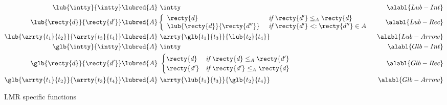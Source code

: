 \begin{figure*}[t]
  \begin{boxedminipage}{\linewidth}
  \begin{align*}
    \lub{\intty}{\intty} \lubred{A}
    &\ \intty & \alabl{Lub-Int} \\
    \lub{\recty{d}}{\recty{d'}} \lubred{A}&
    \left\{
    \begin{array}{ll}
    \recty{d} 
    & \textit{\ if\ } \recty{d'} \leq_A \recty{d}  \\
    \lub{\recty{d}}{\recty{d''}} 
    &\textit{\ if\ } \recty{d'} <: \recty{d''} \in A
    \end{array}\right.
    & \alabl{Lub-Rec} \\
    \lub{\arrty{t_1}{t_2}}{\arrty{t_3}{t_4}}
    \lubred{A} &\ \arrty{\glb{t_1}{t_3}}{\lub{t_2}{t_4}} & \alabl{Lub-Arrow} \\
    \glb{\intty}{\intty}
    \lubred{A}&\ \intty & \alabl{Glb-Int} \\
    \glb{\recty{d}}{\recty{d'}}
    \lubred{A}&\
                     \begin{cases}
                       \recty{d} & \textit{if } \recty{d} \leq_A \recty{d'} \\
                       \recty{d'} &  \textit{if } \recty{d'} \leq_A \recty{d} \\
                     \end{cases} & \alabl{Glb-Rec} \\
    \glb{\arrty{t_1}{t_2}}{\arrty{t_3}{t_4}}
    \lubred{A}&\ \arrty{\lub{t_1}{t_3}}{\glb{t_2}{t_4}} & \alabl{Glb-Arrow}\\
  \end{align*}\vspace*{-8mm}
  \end{boxedminipage}
  \caption{LMR specific functions}
\end{figure*}